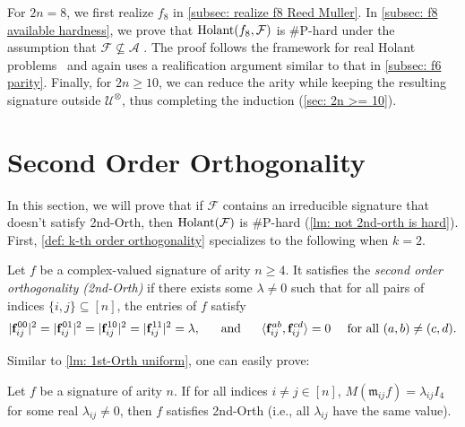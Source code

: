 For $2n=8$, we first realize $f_8$ in \cref{subsec: realize f8 Reed Muller}.
In \cref{subsec: f8 available hardness}, we prove that $\operatorname{Holant}(f_8,\mathcal{F})$ is \#P-hard under the assumption that $\mathcal{F}\not\subseteq\mathscr{A}$ .
The proof follows the framework for real Holant problems~\cite{realholant} and again uses a realification argument similar to that in \cref{subsec: f6 parity}.
Finally, for $2n\geq 10$, 
we can reduce the arity while keeping the resulting signature outside $\mathcal{U}^{\otimes}$, thus completing the induction (\cref{sec: 2n >= 10}).

\section{Second Order Orthogonality}\label{sec: second order orthoganality}
In this section, we will prove that if $\mathcal{F}$ contains an irreducible signature that doesn't satisfy {\sc 2nd-Orth}, then $\operatorname{Holant}(\mathcal{F})$ is \#P-hard (\cref{lm: not 2nd-orth is hard}).
First, \cref{def: k-th order orthogonality} specializes to the following when $k=2$.
\begin{definition}\label{def: second-order-orth}
    Let $f$ be a complex-valued signature of arity $n \geqslant 4$. It satisfies the \emph{second order orthogonality ({\sc 2nd-Orth})} if there exists some $\lambda\neq 0$ such that for all pairs of indices $\{i, j\}\subseteq [n]$, the entries of $f$ satisfy 
    \begin{equation*}
        |{\bf f}_{ij}^{00}|^2=|{\bf f}_{ij}^{01}|^2=|{\bf f}_{ij}^{10}|^2=|{\bf f}_{ij}^{11}|^2=\lambda, 
    \text{ ~~~~\rm and }~~~~ \langle{\bf f}_{ij}^{ab}, {\bf f}_{ij}^{cd}\rangle =0 ~~~~\text{\rm  for  all } (a, b)\neq (c, d).
    \end{equation*}
\end{definition}

Similar to \cref{lm: 1st-Orth uniform}, one can easily prove:
\begin{lemma}\label{lm: 2nd-Orth uniform}
    Let $f$ be a signature of arity $n$.
    If for all indices $i\neq j\in [n]$, $M(\mathfrak{m}_{ij}f)= \lambda_{ij} I_4$ for some real $\lambda_{ij}\neq 0$, then $f$ satisfies {\sc 2nd-Orth} (i.e., all $\lambda_{ij}$ have the same value).
\end{lemma}


